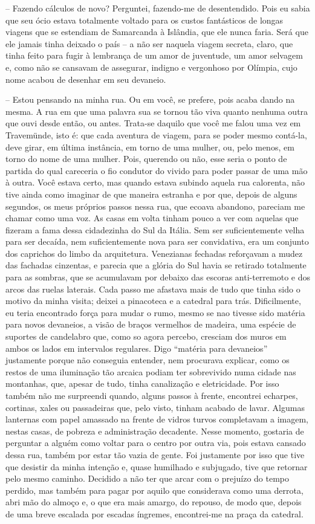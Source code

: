 -- Fazendo cálculos de novo? Perguntei, fazendo-me de desentendido. Pois
eu sabia que seu ócio estava totalmente voltado para os custos
fantásticos de longas viagens que se estendiam de Samarcanda à Islândia,
que ele nunca faria. Será que ele jamais tinha deixado o país -- a não
ser naquela viagem secreta, claro, que tinha feito para fugir à
lembrança de um amor de juventude, um amor selvagem e, como não se
cansavam de assegurar, indigno e vergonhoso por Olímpia, cujo nome
acabou de desenhar em seu devaneio.

-- Estou pensando na minha rua. Ou em você, se prefere, pois acaba dando
na mesma. A rua em que uma palavra sua se tornou tão viva quanto nenhuma
outra que ouvi desde então, ou antes. Trata-se daquilo que você me falou
uma vez em Travemünde, isto é: que cada aventura de viagem, para se
poder mesmo contá-la, deve girar, em última instância, em torno de uma
mulher, ou, pelo menos, em torno do nome de uma mulher. Pois, querendo
ou não, esse seria o ponto de partida do qual careceria o fio condutor
do vivido para poder passar de uma mão à outra. Você estava certo, mas
quando estava subindo aquela rua calorenta, não tive ainda como imaginar
de que maneira estranha e por que, depois de alguns segundos, os meus
próprios passos nessa rua, que ecoava abandono, pareciam me chamar como
uma voz. As casas em volta tinham pouco a ver com aquelas que fizeram a
fama dessa cidadezinha do Sul da Itália. Sem ser suficientemente velha
para ser decaída, nem suficientemente nova para ser convidativa, era um
conjunto dos caprichos do limbo da arquitetura. Venezianas fechadas
reforçavam a mudez das fachadas cinzentas, e parecia que a glória do Sul
havia se retirado totalmente para as sombras, que se acumulavam por
debaixo das escoras anti-terremoto e dos arcos das ruelas laterais. Cada
passo me afastava mais de tudo que tinha sido o motivo da minha visita;
deixei a pinacoteca e a catedral para trás. Dificilmente, eu teria
encontrado força para mudar o rumo, mesmo se nao tivesse sido matéria
para novos devaneios, a visão de braços vermelhos de madeira, uma
espécie de suportes de candelabro que, como so agora percebo, cresciam
dos muros em ambos os lados em intervalos regulares. Digo ``matéria para
devaneios'' justamente porque não conseguia entender, nem procurava
explicar, como os restos de uma iluminação tão arcaica podiam ter
sobrevivido numa cidade nas montanhas, que, apesar de tudo, tinha
canalização e eletricidade. Por isso também não me surpreendi quando,
alguns passos à frente, encontrei echarpes, cortinas, xales ou
passadeiras que, pelo visto, tinham acabado de lavar. Algumas lanternas
com papel amassado na frente de vidros turvos completavam a imagem,
nestas casas, de pobreza e administração decadente. Nesse momento,
gostaria de perguntar a alguém como voltar para o centro por outra via,
pois estava cansado dessa rua, também por estar tão vazia de gente. Foi
justamente por isso que tive que desistir da minha intenção e, quase
humilhado e subjugado, tive que retornar pelo mesmo caminho. Decidido a
não ter que arcar com o prejuízo do tempo perdido, mas também para pagar
por aquilo que considerava como uma derrota, abri mão do almoço e, o que
era mais amargo, do repouso, de modo que, depois de uma breve escalada
por escadas íngremes, encontrei-me na praça da catedral.

